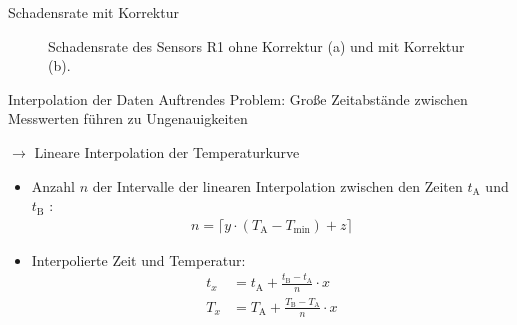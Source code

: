\documentclass[aspectratio=1610, 9pt]{beamer}
\begin{document}
\begin{frame}{Schadensrate mit Korrektur}
  \begin{figure}
  \caption{Schadensrate des Sensors R1 ohne Korrektur (a) und mit Korrektur (b).}
  \end{figure}
\end{frame}


\begin{frame}{Interpolation der Daten}
  Auftrendes Problem: Große Zeitabstände zwischen Messwerten führen zu Ungenauigkeiten
  \medskip

  $\rightarrow$ Lineare Interpolation der Temperaturkurve
  \medskip
  \begin{itemize}
    \item Anzahl $n$ der Intervalle der linearen Interpolation zwischen den Zeiten $t_{\mathrm{A}}$ und $t_{\mathrm{B}}$ :
    \begin{align*}
      n = \lceil{y \cdot (T_{\mathrm{A}}-T_{\mathrm{min}})+ z}\rceil
    \end{align*}

    \item Interpolierte Zeit und Temperatur:
    \begin{align*}
      t_x &= t_{\mathrm{A}} + \frac{t_{\mathrm{B}}-t_{\mathrm{A}}}{n} \cdot x \\
      T_x &= T_{\mathrm{A}} + \frac{T_{\mathrm{B}}-T_{\mathrm{A}}}{n} \cdot x \\
    \end{align*}
  \end{itemize}
\end{frame}
\end{document}
